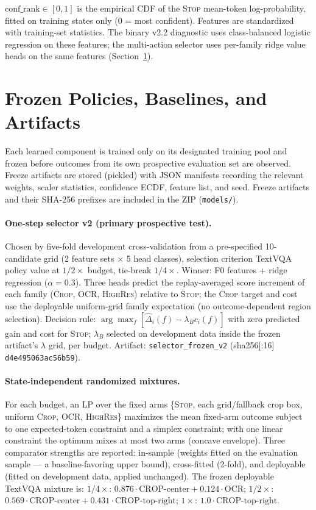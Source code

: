 \documentclass[10pt]{article}
\begin{document}
$\mathrm{conf\_rank}\in[0,1]$ is the empirical CDF of the \textsc{Stop}
mean-token log-probability, fitted on training states only (0 = most
confident). Features are standardized with training-set statistics.
The binary v2.2 diagnostic uses class-balanced logistic regression on these
features; the multi-action selector uses per-family ridge value heads on
the same features (Section~\ref{sec:policies}).

\section{Frozen Policies, Baselines, and Artifacts}
\label{sec:policies}

Each learned component is trained only on its designated training pool and
frozen before outcomes from its own prospective evaluation set are observed.
Freeze artifacts are stored (pickled) with JSON manifests recording the
relevant weights, scaler statistics, confidence ECDF, feature list, and
seed. Freeze artifacts and their SHA-256 prefixes are included in the
ZIP (\texttt{models/}).

\paragraph{One-step selector v2 (primary prospective test).}
Chosen by five-fold development cross-validation from a pre-specified
10-candidate grid (2 feature sets $\times$ 5 head classes), selection
criterion TextVQA policy value at $1/2\times$ budget, tie-break
$1/4\times$. Winner: F0 features + ridge regression ($\alpha=0.3$). Three
heads predict the replay-averaged score increment of each family
(\textsc{Crop}, \textsc{OCR}, \textsc{HighRes}) relative to \textsc{Stop};
the \textsc{Crop} target and cost use the deployable uniform-grid family
expectation (no outcome-dependent region selection). Decision rule:
$\arg\max_f [\widehat\Delta_i(f) - \lambda_B c_i(f)]$ with zero predicted
gain and cost for \textsc{Stop}; $\lambda_B$ selected on development data
inside the frozen artifact's $\lambda$ grid, per budget. Artifact:
\texttt{selector\_frozen\_v2} (sha256[:16] \texttt{d4e495063ac56b59}).

\paragraph{State-independent randomized mixtures.}
For each budget, an LP over the fixed arms \{\textsc{Stop}, each
grid/fallback crop box, uniform \textsc{Crop}, \textsc{OCR},
\textsc{HighRes}\} maximizes the mean fixed-arm outcome subject to one
expected-token constraint and a simplex constraint; with one linear
constraint the optimum mixes at most two arms (concave envelope). Three
comparator strengths are reported: in-sample (weights fitted on the
evaluation sample --- a baseline-favoring upper bound), cross-fitted
(2-fold), and deployable (fitted on development data, applied unchanged).
The frozen deployable TextVQA mixture is:
$1/4\times$: $0.876\cdot\text{CROP-center} + 0.124\cdot\text{OCR}$;
$1/2\times$: $0.569\cdot\text{CROP-center} + 0.431\cdot\text{CROP-top-right}$;
$1\times$: $1.0\cdot\text{CROP-top-right}$.
\end{document}
